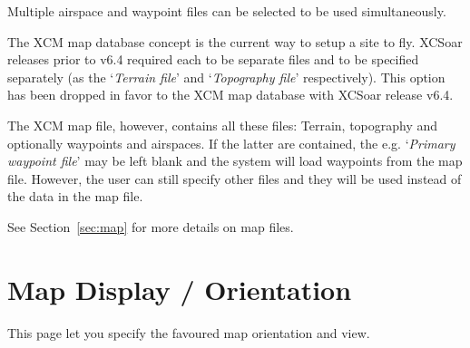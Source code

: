 Multiple airspace and waypoint files can be selected to be used simultaneously.

The XCM map database concept is the current way to setup a site to fly.
XCSoar releases prior to v6.4 required each to be separate files and to be
specified separately (as the `{\it Terrain file}' and `{\it Topography file}' respectively). This 
option has been dropped in favor to the XCM map database with XCSoar release v6.4.  

The XCM map file, however, contains all these files: Terrain, topography
and optionally waypoints and airspaces.  If the latter are contained, the e.g. `{\it Primary waypoint file}' 
may be left blank and the system will load waypoints from the map file. 
However, the user can still specify other files and they will be used instead of 
the data in the map file.

See Section~\ref{sec:map} for more details on map files.


\section{Map Display / Orientation}\label{sec:map-projection}

This page let you specify the favoured map orientation and view.

